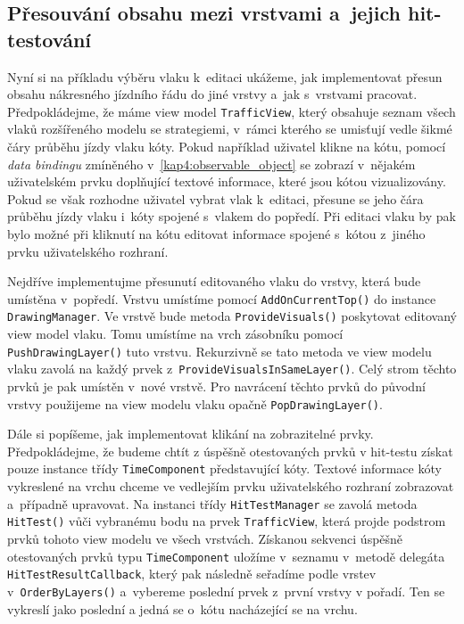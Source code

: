 \subsection*{Přesouvání obsahu mezi vrstvami a~jejich hit-testování}
Nyní si na příkladu výběru vlaku k~editaci ukážeme, jak implementovat přesun obsahu nákresného jízdního řádu do jiné vrstvy a~jak s~vrstvami pracovat. Předpokládejme, že máme view model \texttt{TrafficView}, který obsahuje seznam všech vlaků rozšířeného modelu se strategiemi, v~rámci kterého se umisťují vedle šikmé čáry průběhu jízdy vlaku kóty. Pokud například uživatel klikne na kótu, pomocí \textit{data bindingu} zmíněného v~\ref{kap4:observable_object} se zobrazí v~nějakém uživatelském prvku doplňující textové informace, které jsou kótou vizualizovány. Pokud se však rozhodne uživatel vybrat vlak k~editaci, přesune se jeho čára průběhu jízdy vlaku i~kóty spojené s~vlakem do popředí. Při editaci vlaku by pak bylo možné při kliknutí na kótu editovat informace spojené s~kótou z~jiného prvku uživatelského rozhraní.

Nejdříve implementujme přesunutí editovaného vlaku do vrstvy, která bude umístěna v~popředí. Vrstvu umístíme pomocí \texttt{AddOnCurrentTop()} do instance \texttt{DrawingManager}. Ve vrstvě bude metoda \texttt{ProvideVisuals()} poskytovat editovaný view model vlaku. Tomu umístíme na vrch zásobníku pomocí \linebreak \texttt{PushDrawingLayer()} tuto vrstvu. Rekurzivně se tato metoda ve view modelu vlaku zavolá na každý prvek z~\texttt{ProvideVisualsInSameLayer()}. Celý strom \linebreak těchto prvků je pak umístěn v~nové vrstvě. Pro navrácení těchto prvků do původní vrstvy použijeme na view modelu vlaku opačně \texttt{PopDrawingLayer()}.

Dále si popíšeme, jak implementovat klikání na zobrazitelné prvky. Předpokládejme, že budeme chtít z úspěšně otestovaných prvků v hit-testu získat pouze instance třídy \texttt{TimeComponent} představující kóty. Textové informace kóty vykreslené na vrchu chceme ve vedlejším prvku uživatelského rozhraní zobrazovat a~případně upravovat. Na instanci třídy \texttt{HitTestManager} se zavolá metoda \texttt{HitTest()} vůči vybranému bodu na prvek \texttt{TrafficView}, která projde podstrom prvků tohoto view modelu ve všech vrstvách. Získanou sekvenci úspěšně otestovaných prvků typu \texttt{TimeComponent} uložíme v~seznamu v~metodě delegáta \texttt{HitTestResultCallback}, který pak následně seřadíme podle vrstev \linebreak v~\texttt{OrderByLayers()} a~vybereme poslední prvek z~první vrstvy v pořadí. Ten se vykreslí jako poslední a jedná se o~kótu nacházející se na vrchu.